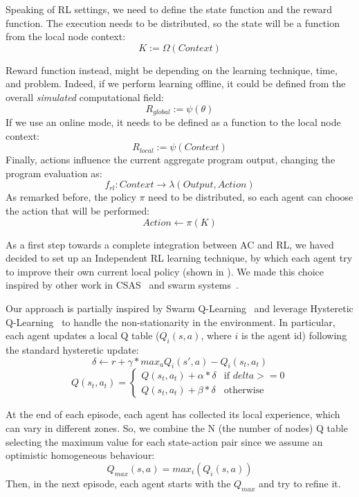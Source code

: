 \documentclass[conference]{IEEEtran}
\begin{document}
Speaking of RL settings, we need to define the state function and the reward function.
%
The execution needs to be distributed, so the state will be a function from the local node context:
$$
K := \Omega(\textit{Context})
$$

Reward function instead, might be depending on the learning technique, time, and problem. 
 Indeed, if we perform learning offline, it could be defined from the overall \textit{simulated} computational field:
$$
\textit{R}_{global} := \psi({\theta})
$$
If we use an online mode, it needs to be defined as a function to the local node context:
$$
\textit{R}_{local} := \psi(\textit{Context})
$$
Finally, actions influence the current aggregate program output, changing the program evaluation as:
$$
f_{rl} : \textit{Context} \rightarrow \lambda(\textit{Output}, \textit{Action})
$$
As remarked before, the policy $\pi$ need to be distributed, so each agent can choose the action that will be performed:
$$
\textit{Action} \leftarrow \pi(K)
$$

As a first step towards a complete integration between AC and RL, we haved decided to set up an Independent RL learning technique, 
 by which each agent try to improve their own current local policy (shown in ). 
% 
We made this choice inspired by other work in CSAS~\cite{csas-and-marl} and swarm systems~\cite{nguyen2018swarm}.

Our approach is partially inspired by Swarm Q-Learning~\cite{nguyen2018swarm} and leverage Hysteretic Q-Learning~\cite{hysteretic-q} to 
 handle the non-stationarity in the environment.
%
In particular, each agent updates a local Q table ($Q_i(s, a)$, where $i$ is the agent id) following the standard hysteretic update:
$$
\delta \leftarrow r + \gamma * max_a Q_i(s', a) - Q_i(s_t, a_t)
$$
$$
Q(s_t, a_t) =  \begin{cases} 
  Q(s_t, a_t) + \alpha * \delta & \mbox{if } delta >= 0 \\ 
  Q(s_t, a_t) + \beta * \delta & \mbox{otherwise }
\end{cases}
$$

At the end of each episode, each agent has collected its local experience, which can vary in different zones. 
 So, we combine the N (the number of nodes) Q table selecting the maximum value for each state-action pair since we assume an optimistic homogeneous behaviour:
$$
Q_{max}(s, a) = max_i(Q_i(s, a))
$$
Then, in the next episode, each agent starts with the $Q_{max}$ and try to refine it.
\end{document}
